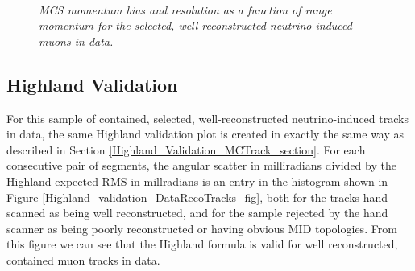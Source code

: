 \begin{figure}
\centering
\mbox{
	\quad
	}
\caption{\textit{MCS momentum bias and resolution as a function of range momentum for the selected, well reconstructed neutrino-induced muons in {\ub} data.}}
\label{MCS_range_bias_resolution_DataRecoTrack_fig}
\end{figure}



\subsection{Highland Validation}\label{Highland_Validation_DataRecoTrack_section}
For this sample of contained, selected, well-reconstructed neutrino-induced tracks in {\ub} data, the same Highland validation plot is created in exactly the same way as described in Section \ref{Highland_Validation_MCTrack_section}. For each consecutive pair of segments, the angular scatter in milliradians divided by the Highland expected RMS in millradians is an entry in the histogram shown in Figure \ref{Highland_validation_DataRecoTracks_fig}, both for the tracks hand scanned as being well reconstructed, and for the sample rejected by the hand scanner as being poorly reconstructed or having obvious MID topologies. From this figure we can see that the Highland formula is valid for well reconstructed, contained muon tracks in data.

